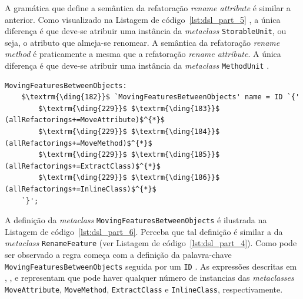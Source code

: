 A gramática que define a semântica da refatoração \textit{rename attribute} é similar a anterior. Como visualizado na Listagem de código~\ref{lst:dsl_part_5} , a única diferença é que deve-se atribuir uma instância da \textit{metaclass} \texttt{StorableUnit}, ou seja, o atributo que almeja-se renomear.  A semântica da refatoração \textit{rename method} é praticamente a mesma que a refatoração \textit{rename attribute}. A única diferença é que deve-se atribuir uma instância da \textit{metaclass} \texttt{MethodUnit} . 

\begin{lstlisting}[language=Xtext, frame=single, basicstyle=\scriptsize, mathescape=true, label={lst:dsl_part_6}, caption={Gramática da DSL - parte 6}]
MovingFeaturesBetweenObjects: 
	$\textrm{\ding{182}}$ `MovingFeaturesBetweenObjects' name = ID `{'
		$\textrm{\ding{229}}$ $\textrm{\ding{183}}$ (allRefactorings+=MoveAttribute)$^{*}$
		$\textrm{\ding{229}}$ $\textrm{\ding{184}}$ (allRefactorings+=MoveMethod)$^{*}$
		$\textrm{\ding{229}}$ $\textrm{\ding{185}}$ (allRefactorings+=ExtractClass)$^{*}$
		$\textrm{\ding{229}}$ $\textrm{\ding{186}}$ (allRefactorings+=InlineClass)$^{*}$
	`}';
\end{lstlisting}

A definição da \textit{metaclass} \texttt{MovingFeaturesBetweenObjects} é ilustrada na Listagem de código~\ref{lst:dsl_part_6}. Perceba que tal definição é similar a da \textit{metaclass} \texttt{RenameFeature} (ver Listagem de código~\ref{lst:dsl_part_4}). Como pode ser observado a regra começa com a definição da palavra-chave \texttt{MovingFeaturesBetweenObjects} seguida por um \texttt{ID} . As expressões descritas em , ,  e  representam que pode haver qualquer número de instancias das \textit{metaclasses} \texttt{MoveAttribute}, \texttt{MoveMethod}, \texttt{ExtractClass} e \texttt{InlineClass}, respectivamente. 

